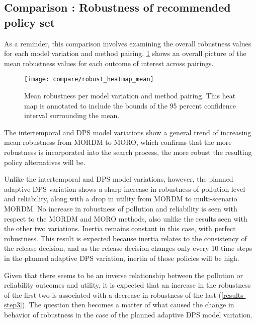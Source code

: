     \subsection{Comparison \thecomparison : Robustness of recommended policy set} 
    As a reminder, this comparison involves examining the overall robustness values for each model variation and method pairing. \cref{fig:robust-heatmap-mean} shows an overall picture of the mean robustness values for each outcome of interest across pairings.
    
    \begin{figure}[ht]
        \centering
        \captionsetup{width=0.8\textwidth}
        
        \texttt{[image: compare/robust\_heatmap\_mean]}
        \caption[Heatmap of mean robustness across all pairings.]{Mean robustness per model variation and method pairing. This heat map is annotated to include the bounds of the 95 percent confidence interval surrounding the mean.}
        \label{fig:robust-heatmap-mean}
    \end{figure}
    
    The intertemporal and DPS model variations show a general trend of increasing mean robustness from MORDM to MORO, which confirms that the more robustness is incorporated into the search process, the more robust the resulting policy alternatives will be. 
    
    Unlike the intertemporal and DPS model variations, however, the planned adaptive DPS variation shows a sharp increase in robustness of pollution level and reliability, along with a drop in utility from MORDM to multi-scenario MORDM. No increase in robustness of pollution and reliability is seen with respect to the MORDM and MORO methods, also unlike the results seen with the other two variations. Inertia remains constant in this case, with perfect robustness. This result is expected because inertia relates to the consistency of the release decision, and as the release decision changes only every 10 time steps in the planned adaptive DPS variation, inertia of those policies will be high. 
    
    Given that there seems to be an inverse relationship between the pollution or reliability outcomes and utility, it is expected that an increase in the robustness of the first two is associated with a decrease in robustness of the last (\cref{results-step3}). The question then becomes a matter of what caused the change in behavior of robustness in the case of the planned adaptive DPS model variation. 
    
